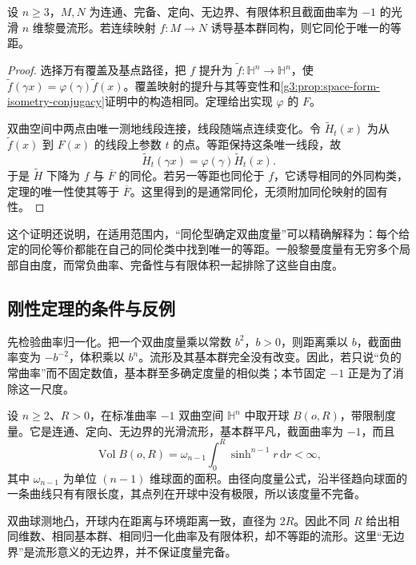 \begin{corollary}\label{g3:cor:D-rigidity-homotopy}
	设 \(n\ge3\)，\(M,N\) 为连通、完备、定向、无边界、有限体积且截面曲率为 \(-1\) 的光滑 \(n\) 维黎曼流形。若连续映射 \(f:M\to N\) 诱导基本群同构，则它同伦于唯一的等距。
\end{corollary}
\begin{proof}
	选择万有覆盖及基点路径，把 \(f\) 提升为 \(\widetilde f:\mathbb H^n\to\mathbb H^n\)，使
	\(\widetilde f(\gamma x)=\varphi(\gamma)\widetilde f(x)\)。覆盖映射的提升与其等变性和\cref{g3:prop:space-form-isometry-conjugacy}证明中的构造相同。定理给出实现 \(\varphi\) 的 \(F\)。

	双曲空间中两点由唯一测地线段连接，线段随端点连续变化。令 \(\widetilde H_t(x)\) 为从 \(\widetilde f(x)\) 到 \(F(x)\) 的线段上参数 \(t\) 的点。等距保持这条唯一线段，故
	\[
		\widetilde H_t(\gamma x)=\varphi(\gamma)\widetilde H_t(x).
	\]
	于是 \(\widetilde H\) 下降为 \(f\) 与 \(\overline F\) 的同伦。若另一等距也同伦于 \(f\)，它诱导相同的外同构类，定理的唯一性使其等于 \(\overline F\)。这里得到的是通常同伦，无须附加同伦映射的固有性。
\end{proof}

这个证明还说明，在适用范围内，“同伦型确定双曲度量”可以精确解释为：每个给定的同伦等价都能在自己的同伦类中找到唯一的等距。一般黎曼度量有无穷多个局部自由度，而常负曲率、完备性与有限体积一起排除了这些自由度。

\subsection{刚性定理的条件与反例}
\label{g3:subsec:D05:03}

先检验曲率归一化。把一个双曲度量乘以常数 \(b^2\)，\(b>0\)，则距离乘以 \(b\)，截面曲率变为 \(-b^{-2}\)，体积乘以 \(b^n\)。流形及其基本群完全没有改变。因此，若只说“负的常曲率”而不固定数值，基本群至多确定度量的相似类；本节固定 \(-1\) 正是为了消除这一尺度。

\begin{example}\label{g3:exm:D-incomplete-balls}
	设 \(n\ge2\)、\(R>0\)，在标准曲率 \(-1\) 双曲空间 \(\mathbb H^n\) 中取开球 \(B(o,R)\)，带限制度量。它是连通、定向、无边界的光滑流形，基本群平凡，截面曲率为 \(-1\)，而且
	\[
		\operatorname{Vol}B(o,R)
		=\omega_{n-1}\int_0^R\sinh^{n-1}r\,\mathrm dr<\infty,
	\]
	其中 \(\omega_{n-1}\) 为单位 \((n-1)\) 维球面的面积。由径向度量公式，沿半径趋向球面的一条曲线只有有限长度，其点列在开球中没有极限，所以该度量不完备。

	双曲球测地凸，开球内在距离与环境距离一致，直径为 \(2R\)。因此不同 \(R\) 给出相同维数、相同基本群、相同归一化曲率及有限体积，却不等距的流形。这里“无边界”是流形意义的无边界，并不保证度量完备。
\end{example}

